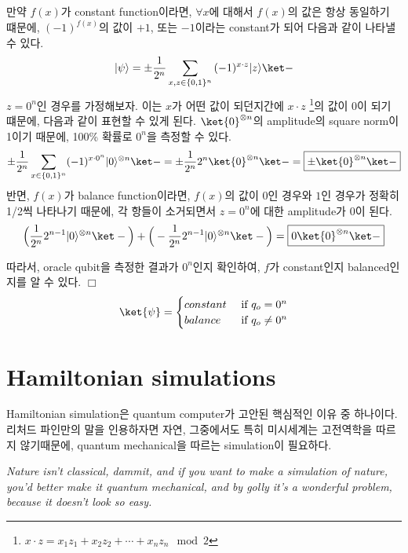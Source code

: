 \begin{enumerate}
  만약 $f(x)$가 constant function이라면, $\forall x$에 대해서 $f(x)$의 값은 항상 동일하기 떄문에, $(-1)^{f(x)}$의 값이 $+1$, 또는 $-1$이라는 constant가 되어 다음과 같이 나타낼 수 있다.
  \begin{align*}
  \left|\psi\right\rangle= \pm \frac{1}{{2^{n}}} \sum_{x, z \in\{0,1\}^n} {(-1)^{x\cdot z}|z\rangle} \ket -
  \end{align*}
  $z = 0^n$인 경우를 가정해보자. 이는 $x$가 어떤 값이 되던지간에 $x\cdot z$ \footnote{ $x \cdot z = x_1 z_1 + x_2 z_2 + \cdots + x_n z_n \mod 2$ }의 값이 0이 되기 떄문에, 다음과 같이 표현할 수 있게 된다.
  $\ket{0}^{\otimes n}$의 amplitude의 square norm이 1이기 때문에, 100\% 확률로 $0^n$을 측정할 수 있다.
  \begin{align*}
    \pm \frac{1}{{2^n}} \sum_{x \in\{0,1\}^n} (-1)^{x\cdot 0^n} |0\rangle^{\otimes n} \ket - = \pm \frac{1}{{2^n}}{2^n} \ket{0}^{\otimes n} \ket - = \boxed{\pm \ket{0}^{\otimes n} \ket -} 
  \end{align*}
  반면, $f(x)$가 balance function이라면, $f(x)$의 값이 $0$인 경우와 $1$인 경우가 정확히 1/2씩 나타나기 때문에, 각 항들이 소거되면서 $z=0^n$에 대한 amplitude가 0이 된다.
  \begin{align*}
    \Big(\frac{1}{{2^n}} 2^{n-1} |0\rangle^{\otimes n} \ket - \Big) + \Big( - \frac{1}{{2^n}} 2^{n-1} |0\rangle^{\otimes n} \ket - \Big) = \boxed{0 \ket{0}^{\otimes n} \ket -} 
  \end{align*}
\end{enumerate}
따라서, oracle qubit을 측정한 결과가 $0^n$인지 확인하여, $f$가 constant인지 balanced인지를 알 수 있다. $\Box$
  \begin{equation*}
    \ket{\psi} = \begin{cases}
      constant & \text{ if } q_o = 0^n\\ 
      balance & \text{ if } q_o \ne 0^n
    \end{cases}
  \end{equation*}

\section{Hamiltonian simulations}
Hamiltonian simulation은 quantum computer가 고안된 핵심적인 이유 중 하나이다. 리처드 파인만의 말을 인용하자면 자연, 그중에서도 특히 미시세계는 고전역학을 따르지 않기때문에, quantum mechanical을 따르는 simulation이 필요하다.
\begin{note}
  \textit{Nature isn’t classical, dammit, and if you want to make a simulation of nature, you’d better make it quantum mechanical, and by golly it’s a wonderful problem, because it doesn’t look so easy.}
\end{note}


